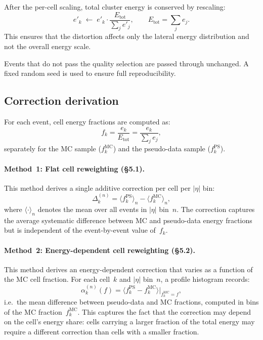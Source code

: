 \documentclass[12pt,a4paper]{article}
\begin{document}
After the per-cell scaling, total cluster energy is conserved by rescaling:
\begin{equation}
  e'_k \;\leftarrow\; e'_k \cdot \frac{E_\text{tot}}{\sum_j e'_j},
  \qquad E_\text{tot} = \sum_j e_j.
  \label{eq:energycons}
\end{equation}
This ensures that the distortion affects only the lateral energy distribution
and not the overall energy scale.

Events that do not pass the quality selection are passed through unchanged. A
fixed random seed is used to ensure full reproducibility.

\subsection{Correction derivation}
\label{sec:method:derive}

For each event, cell energy fractions are computed as:
\begin{equation}
  f_k = \frac{e_k}{E_\text{tot}} = \frac{e_k}{\sum_j e_j},
  \label{eq:fraction}
\end{equation}
separately for the MC sample ($f_k^\text{MC}$) and the pseudo-data sample
($f_k^\text{PS}$).

\paragraph{Method~1: Flat cell reweighting (§5.1).}
This method derives a single additive correction per cell per $|\eta|$ bin:
\begin{equation}
  \Delta_k^{(n)} =
  \langle f_k^\text{PS}\rangle_n
  - \langle f_k^\text{MC}\rangle_n,
  \label{eq:m1derive}
\end{equation}
where $\langle\cdot\rangle_n$ denotes the mean over all events in $|\eta|$
bin~$n$. The correction captures the average systematic difference between MC
and pseudo-data energy fractions but is independent of the event-by-event
value of~$f_k$.

\paragraph{Method~2: Energy-dependent cell reweighting (§5.2).}
This method derives an energy-dependent correction that varies as a function
of the MC cell fraction. For each cell~$k$ and $|\eta|$ bin~$n$, a profile
histogram records:
\begin{equation}
  \alpha_k^{(n)}(f) =
  \bigl\langle
    f_k^\text{PS} - f_k^\text{MC}
  \bigr\rangle \Big|_{f_k^\text{MC} = f},
  \label{eq:m2derive}
\end{equation}
i.e.\ the mean difference between pseudo-data and MC fractions, computed in
bins of the MC fraction~$f_k^\text{MC}$. This captures the fact that the
correction may depend on the cell's energy share: cells carrying a larger
fraction of the total energy may require a different correction than cells
with a smaller fraction.
\end{document}
